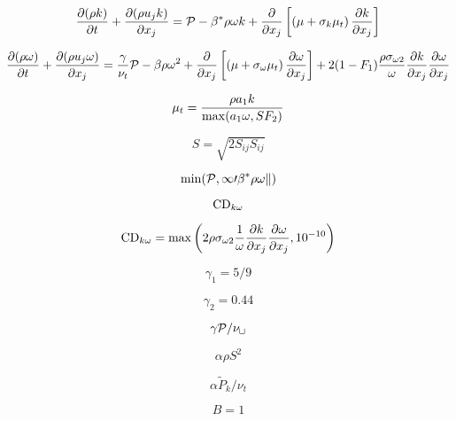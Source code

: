 

\begin{equation}
\frac{\partial (\rho k)}{\partial t} + \frac{\partial (\rho u_j k)}{\partial x_j}
  = {\cal P} - \beta^* \rho \omega k  + \frac{\partial}{\partial x_j}
  \left[\left(\mu + \sigma_k \mu_t \right)\frac{\partial k}{\partial x_j}\right]
\end{equation}

\begin{equation}
\frac{\partial (\rho \omega)}{\partial t} + \frac{\partial (\rho u_j \omega)}{\partial x_j}
  = \frac{\gamma}{\nu_t} {\cal P} -
  \beta \rho \omega^2 + \frac{\partial}{\partial x_j}
  \left[ \left( \mu + \sigma_{\omega} \mu_t \right)
  \frac{\partial \omega}{\partial x_j} \right] +
  2(1-F_1) \frac{\rho \sigma_{\omega 2}}{\omega} \frac{\partial k}{\partial x_j}
  \frac{\partial \omega}{\partial x_j}
\end{equation}

\begin{equation}
\mu_t = \frac{\rho a_1 k}{{\rm max} (a_1 \omega, S F_2)}
\end{equation}

\begin{equation}
S = \sqrt{2 S_{ij}S_{ij}}
\end{equation}

\begin{equation}
{\rm min}(\cal P, 10 \beta^* \rho \omega k)
\end{equation}

\begin{equation}
{\rm CD}_{k \omega}
\end{equation}

\begin{equation}
{\rm CD}_{k \omega} = {\rm max} \left(2 \rho \sigma_{\omega 2} \frac{1}{\omega}
   \frac{\partial k}{\partial x_j} \frac{\partial \omega}{\partial x_j}, 10^{-10} \right)
\end{equation}

\begin{equation}
\gamma_1 = 5/9
\end{equation}

\begin{equation}
\gamma_2 = 0.44
\end{equation}

\begin{equation}
\gamma \cal P / \nu_t
\end{equation}

\begin{equation}
\alpha \rho S^2
\end{equation}

\begin{equation}
\alpha \tilde P_k / \nu_t
\end{equation}

\begin{equation}
B=1
\end{equation}


